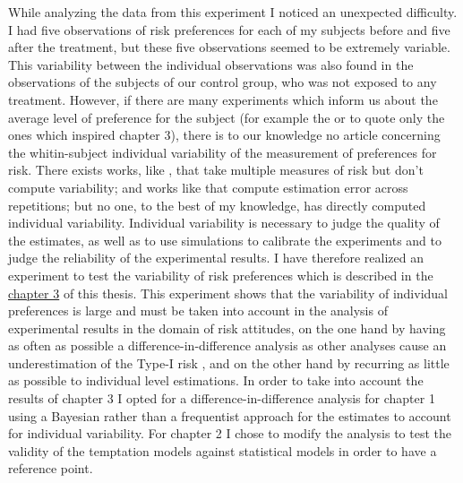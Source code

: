 \documentclass[
]{book}
\begin{document}
While analyzing the data from this experiment I noticed an unexpected
difficulty.
I had five observations of risk preferences for each of my subjects before and
five after the treatment, but these five observations seemed to be extremely variable.
This variability between the individual observations was also found in the
observations of the subjects of our control group, who was not exposed to any treatment.
However, if there are many experiments which inform us about the average level
of preference for the subject (for example the \citet{lejuez2002evaluation} or
\citet{crosetto2013bomb} to quote only the ones which inspired chapter 3), there is to
our knowledge no article concerning the whitin-subject individual variability of the
measurement of preferences for risk.
There exists works, like \citet{ert2017revisiting}, that take multiple measures of risk
but don't
compute variability; and works like \citet{wilcox2007predicting} that compute estimation
error across repetitions; but no one, to the best of my knowledge, has directly computed individual variability.
Individual variability is necessary to judge the quality of the estimates, as
well as to use simulations to calibrate the experiments and to judge the
reliability of the experimental results.
I have therefore realized an experiment to test the variability of risk
preferences which is described in the \protect\hyperlink{multi-choice}{chapter 3} of this thesis.
This experiment shows that the variability of individual preferences is
large and must be taken into account in the analysis of experimental
results in the domain of risk attitudes, on the one hand by having as often as possible a
difference-in-difference analysis as other analyses cause an
underestimation of the Type-I risk
, and on the other hand by
recurring as little as possible to individual level estimations.
In order to take into account the results of chapter 3 I opted for a
difference-in-difference analysis for chapter 1 using a Bayesian rather
than a frequentist approach for the estimates to account for individual
variability.
For chapter 2 I chose to modify the analysis to test the validity of the
temptation models against statistical models in order to have a reference point.
\end{document}
